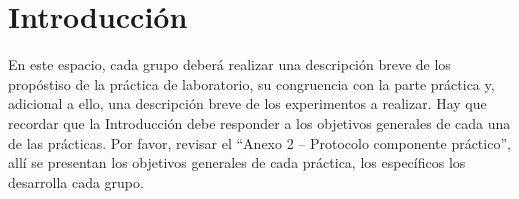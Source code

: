 \section{Introducción}

En este espacio, cada grupo deberá realizar una descripción breve de los propóstiso de la práctica de laboratorio, su congruencia con la parte práctica y, adicional a ello, una descripción breve de los experimentos a realizar. Hay que recordar que la Introducción debe responder a los objetivos generales de cada una de las prácticas. Por favor, revisar el “Anexo 2 – Protocolo componente práctico”, allí se presentan los objetivos generales de cada práctica, los específicos los desarrolla cada grupo.

